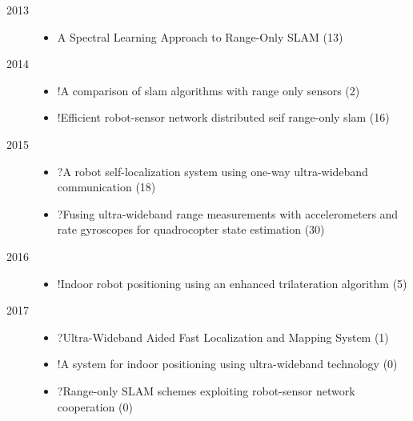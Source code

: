 \begin{description}
\item[2013]
\begin{itemize}
\item A Spectral Learning Approach to Range-Only {SLAM} (13)
\end{itemize}

\item[2014]
\begin{itemize}
\item !A comparison of slam algorithms with range only sensors (2)
\item !Efficient robot-sensor network distributed seif range-only slam (16)
\end{itemize}

\item[2015]
\begin{itemize}
\item ?A robot self-localization system using one-way ultra-wideband communication (18)
\item ?Fusing ultra-wideband range measurements with accelerometers and rate gyroscopes for quadrocopter state estimation (30)
\end{itemize}

\item[2016]
\begin{itemize}
\item !Indoor robot positioning using an enhanced trilateration algorithm (5)
\end{itemize}

\item[2017]
\begin{itemize}
\item ?Ultra-Wideband Aided Fast Localization and Mapping System (1)
\item !A system for indoor positioning using ultra-wideband technology (0)
\item ?Range-only SLAM schemes exploiting robot-sensor network cooperation (0)
\end{itemize}


\end{description}


\begin{comment}
------------------------------------------------------------------------------------------
\end{comment}
